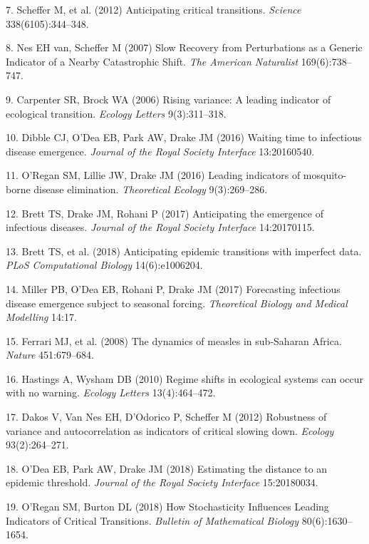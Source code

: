 \documentclass[3p]{elsarticle} %
\begin{document}
\hypertarget{ref-Scheffer2012}{}
7. Scheffer M, et al. (2012) Anticipating critical transitions.
\emph{Science} 338(6105):344--348.

\hypertarget{ref-VanNes2007}{}
8. Nes EH van, Scheffer M (2007) Slow Recovery from Perturbations as a
Generic Indicator of a Nearby Catastrophic Shift. \emph{The American
Naturalist} 169(6):738--747.

\hypertarget{ref-Carpenter2006}{}
9. Carpenter SR, Brock WA (2006) Rising variance: A leading indicator of
ecological transition. \emph{Ecology Letters} 9(3):311--318.

\hypertarget{ref-Dibble2016}{}
10. Dibble CJ, O'Dea EB, Park AW, Drake JM (2016) Waiting time to
infectious disease emergence. \emph{Journal of the Royal Society
Interface} 13:20160540.

\hypertarget{ref-ORegan2016}{}
11. O'Regan SM, Lillie JW, Drake JM (2016) Leading indicators of
mosquito-borne disease elimination. \emph{Theoretical Ecology}
9(3):269--286.

\hypertarget{ref-Brett2017}{}
12. Brett TS, Drake JM, Rohani P (2017) Anticipating the emergence of
infectious diseases. \emph{Journal of the Royal Society Interface}
14:20170115.

\hypertarget{ref-Brett2018}{}
13. Brett TS, et al. (2018) Anticipating epidemic transitions with
imperfect data. \emph{PLoS Computational Biology} 14(6):e1006204.

\hypertarget{ref-Miller2017}{}
14. Miller PB, O'Dea EB, Rohani P, Drake JM (2017) Forecasting
infectious disease emergence subject to seasonal forcing.
\emph{Theoretical Biology and Medical Modelling} 14:17.

\hypertarget{ref-Ferrari2008}{}
15. Ferrari MJ, et al. (2008) The dynamics of measles in sub-Saharan
Africa. \emph{Nature} 451:679--684.

\hypertarget{ref-Hastings2010}{}
16. Hastings A, Wysham DB (2010) Regime shifts in ecological systems can
occur with no warning. \emph{Ecology Letters} 13(4):464--472.

\hypertarget{ref-Dakos2012a}{}
17. Dakos V, Van Nes EH, D'Odorico P, Scheffer M (2012) Robustness of
variance and autocorrelation as indicators of critical slowing down.
\emph{Ecology} 93(2):264--271.

\hypertarget{ref-ODea2018a}{}
18. O'Dea EB, Park AW, Drake JM (2018) Estimating the distance to an
epidemic threshold. \emph{Journal of the Royal Society Interface}
15:20180034.

\hypertarget{ref-ORegan2018}{}
19. O'Regan SM, Burton DL (2018) How Stochasticity Influences Leading
Indicators of Critical Transitions. \emph{Bulletin of Mathematical
Biology} 80(6):1630--1654.
\end{document}
